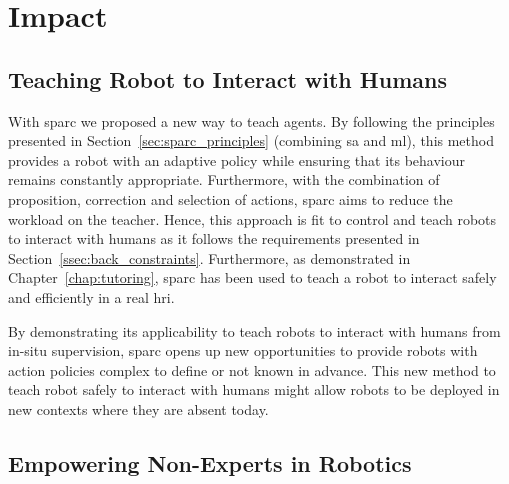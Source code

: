 \section{Impact} \label{sec:disc_impact}


\subsection{Teaching Robot to Interact with Humans}

With \gls{sparc} we proposed a new way to teach agents. By following the principles presented in Section~\ref{sec:sparc_principles} (combining \gls{sa} and \gls{ml}), this method provides a robot with an adaptive policy while ensuring that its behaviour remains constantly appropriate. Furthermore, with the combination of proposition, correction and selection of actions, \gls{sparc} aims to reduce the workload on the teacher. Hence, this approach is fit to control and teach robots to interact with humans as it follows the requirements presented in Section~\ref{ssec:back_constraints}. Furthermore, as demonstrated in Chapter~\ref{chap:tutoring}, \gls{sparc} has been used to teach a robot to interact safely and efficiently in a real \gls{hri}. 

By demonstrating its applicability to teach robots to interact with humans from in-situ supervision, \gls{sparc} opens up new opportunities to provide robots with action policies complex to define or not known in advance. This new method to teach robot safely to interact with humans might allow robots to be deployed in new contexts where they are absent today.


\subsection{Empowering Non-Experts in Robotics}

